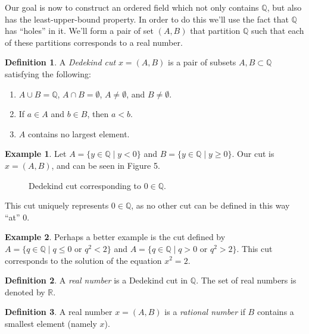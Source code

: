 \documentclass{article}
\newcommand{\R}{\mathbb{R}}
\newcommand{\Q}{\mathbb{Q}}
\theoremstyle{definition}
\newtheorem{definition}{Definition}[section]
\newtheorem{example}{Example}[section]
\begin{document}
Our goal is now to construct an ordered field which not only contains $ \Q $, but also has the least-upper-bound property. In order to do this we'll use the fact that $ \Q $ has ``holes'' in it. We'll form a pair of set $ (A,B) $ that partition $ \Q $ such that each of these partitions corresponds to a real number. 

\begin{definition}
	A \textit{\color{red}Dedekind cut} $ x=(A,B) $ is a pair of subsets $ A,B\subset \Q $ satisfying the following:
	\begin{enumerate}
		\item $ A\cup B=\Q $, $ A\cap B=\emptyset $, $ A\neq\emptyset $, and $ B\neq\emptyset $.
		\item If $ a\in A $ and $ b\in B $, then $ a<b $.
		\item $ A $ contains no largest element.
	\end{enumerate}
\end{definition} 
\begin{example}
	Let $ A=\{y\in \Q \mid y<0\} $ and $ B=\{y\in\Q\mid y\ge 0\} $. Our cut is $ x=(A,B) $, and can be seen in Figure 5.
		\begin{figure}[h]
		\centering
		\caption{Dedekind cut corresponding to $ 0\in\Q $.}
	\end{figure}
This cut uniquely represents $ 0\in\Q $, as no other cut can be defined in this way ``at'' $ 0 $. 
\end{example}
\begin{example}
	Perhaps a better example is the cut defined by $ A=\{q\in\Q\mid q\le 0\text{ or }q^2<2 \} $ and $ A=\{q\in\Q\mid q> 0\text{ or }q^2>2 \} $. This cut corresponds to the solution of the equation $ x^2=2 $.  
\end{example}
\begin{definition}
	A \textit{\color{red}real number} is a Dedekind cut in $ \Q $. The set of real numbers is denoted by $ \R $. 
\end{definition}
\begin{definition}
	A real number $ x=(A,B) $ is a \textit{\color{red}rational number} if $ B $ contains a smallest element (namely $ x $).
\end{definition}
\end{document}
